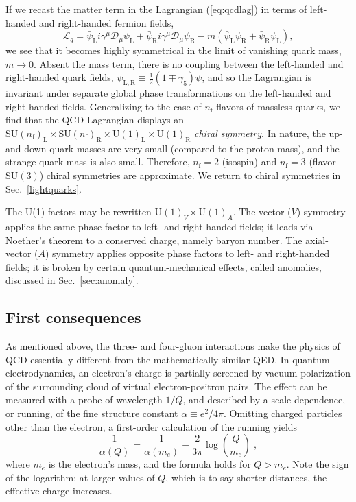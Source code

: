 \documentclass[11pt,prb,groupedaddress,nofootinbib,showpacs,floatfix]{revtex4-1}
\renewcommand{\cfrac}[2]{{\frac{#1}{#2}}}
\newcommand{\gtimes}{\times}
\newcommand{\D}{\ensuremath{\mathcal{D}}}
\begin{document}
If we recast the matter term in the Lagrangian (\ref{eq:qcdlag}) in
terms of left-handed and right-handed fermion fields,
\begin{equation}
	\mathcal{L}_{q} =
		\bar{\psi}_{\mathrm{L}}i\gamma^{\mu}\D_{\mu}\psi_{\mathrm{L}}
		+ \bar{\psi}_{\mathrm{R}}i\gamma^{\mu}\D_{\mu}\psi_{\mathrm{R}}
		-m\left(\bar{\psi}_{\mathrm{L}}\psi_{\mathrm{R}} +
		\bar{\psi}_{\mathrm{R}}\psi_{\mathrm{L}} \right),
    \label{eq:chiral}
\end{equation}
we see that it becomes highly symmetrical in the limit of vanishing
quark mass, $m \to 0$. Absent the mass term, there is no coupling
between the left-handed and right-handed quark fields,
$\psi_{\mathrm{L,R}} \equiv \cfrac{1}{2}(1 \mp \gamma_5)\psi$, and so
the Lagrangian is invariant under separate global phase transformations
on the left-handed and right-handed fields. Generalizing to the case of
$n_{\mathrm{f}}$ flavors of massless quarks, we find that the QCD
Lagrangian displays an
$\mathrm{SU(\mathit{n}_{\mathrm{f}})_L}\gtimes%
\mathrm{SU(\mathit{n}_{\mathrm{f}})_R}\gtimes%
\mathrm{U(1)_L}\gtimes\mathrm{U(1)_R}$
\emph{chiral symmetry}.
In nature, the up- and down-quark masses are very small (compared to 
the proton mass), and the strange-quark mass is also small.
Therefore, $n_{\mathrm{f}}=2$ (isospin) and $n_{\mathrm{f}}=3$ (flavor 
$\mathrm{SU}(3)$) chiral symmetries are approximate.
We return to chiral symmetries in Sec.~\ref{lightquarks}.

The U(1) factors may be rewritten $\mathrm{U}(1)_V\gtimes\mathrm{U}(1)_A$.
The vector ($V$) symmetry applies the same phase factor to left- and 
right-handed fields; it leads via Noether's theorem to a conserved 
charge, namely baryon number.
The axial-vector ($A$) symmetry applies opposite phase factors to left- 
and right-handed fields;
it is broken by certain quantum-mechanical effects, called anomalies, 
discussed in Sec.~\ref{sec:anomaly}.

\subsection{First consequences}
\label{sec:qcd:first}

As mentioned above, the three- and four-gluon interactions make the 
physics of QCD essentially different from the mathematically similar QED.
In quantum electrodynamics, an electron's charge is partially screened
by vacuum polarization of the surrounding cloud of virtual
electron-positron pairs.
The effect can be measured with a probe of wavelength $1/Q$, 
and described by a scale dependence, or running, of the fine structure 
constant $\alpha\equiv e^2/4\pi$.
Omitting charged particles other than the electron, a first-order 
calculation of the running yields
\begin{equation}
    \frac{1}{\alpha(Q)} = \frac{1}{\alpha(m_e)} - 
        \frac{2}{3\pi} \log\left(\frac{Q}{m_e}\right)\;,
\end{equation}
where $m_e$ is the electron's mass, and the formula holds for $Q>m_e$.
Note the sign of the logarithm: at larger values of $Q$, which is to 
say shorter distances, the effective charge increases.
\end{document}
